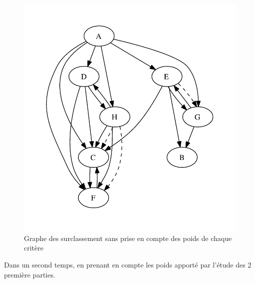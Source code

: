 \begin{figure}[!ht]
\includegraphics{../SourcesMatlab/electre3-1.pdf}
\caption{Graphe des surclassement sans prise en compte des poids de chaque critère}
\end{figure}

Dans un second temps, en prenant en compte les poids apporté par l'étude des 2 première parties.
